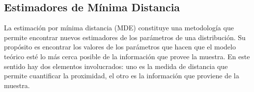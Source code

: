 \subsection{Estimadores de Mínima Distancia}
\label{MDE}

La estimación por mínima distancia (MDE) constituye una metodología que permite encontrar nuevos estimadores de los parámetros de una distribución. Su propósito es encontrar los valores de los parámetros que hacen que el modelo teórico esté lo más cerca posible de la información que provee la muestra. En este sentido hay dos elementos involucrados: uno es la medida de distancia que permite cuantificar la proximidad, el otro es la información que proviene de la muestra. 

%
%
